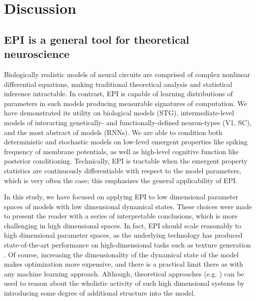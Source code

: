 \documentclass[11pt]{article}
\begin{document}
\section{Discussion}
\subsection{EPI is a general tool for theoretical neuroscience} 
Biologically realistic models of neural circuits are comprised of complex nonlinear differential equations, making traditional theoretical analysis and statistical inference intractable. 
In contrast, EPI is capable of learning distributions of parameters in such models producing measurable signatures of computation.
We have demonstrated its utility on biological models (STG), intermediate-level models of interacting genetically- and functionally-defined neuron-types (V1, SC), and the most abstract of models (RNNs).  
We are able to condition both deterministic and stochastic models on low-level emergent properties like spiking frequency of membrane potentials, as well as high-level cognitive function like posterior conditioning.
Technically, EPI is tractable when the emergent property statistics are continuously differentiable with respect to the model parameters, which is very often the case; this emphasizes the general applicability of EPI.

In this study, we have focused on applying EPI to low dimensional parameter spaces of models with low dimensional dynamical states.
These choices were made to present the reader with a series of  interpretable conclusions, which is more challenging in high dimensional spaces.
In fact, EPI should scale reasonably to high dimensional parameter spaces, as the underlying technology has produced state-of-the-art performance on high-dimensional tasks such as texture generation \cite{loaiza2017maximum}.
Of course, increasing the dimensionality of the dynamical state of the model makes optimization more expensive, and there is a practical limit there as with any machine learning approach.
Although, theoretical approaches (e.g. \cite{mastrogiuseppe2018linking}) can be used to reason about the wholistic activity of such high dimensional systems by introducing some degree of additional structure into the model.
\end{document}
